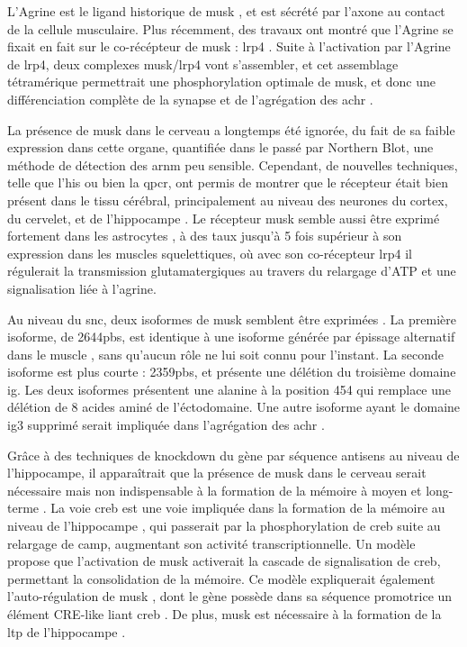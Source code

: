 	L'Agrine est le ligand historique de \gls{musk} \cite{Glass1996}, et est sécrété par l'axone au contact de la cellule musculaire. Plus récemment, des travaux ont montré que l'Agrine se fixait en fait sur le co-récépteur de \gls{musk} : \gls{lrp}4 \cite{Zhang2008,Kim2008}. Suite à l'activation par l'Agrine de \acrshort{lrp}4, deux complexes \gls{musk}/\gls{lrp}4 vont s'assembler, et cet assemblage tétramérique permettrait une phosphorylation optimale de \gls{musk}, et donc une différenciation complète de la synapse et de l'agrégation des \gls{achr} \cite{Zong2012}.
	
	La présence de \gls{musk} dans le cerveau a longtemps été ignorée, du fait de sa faible expression dans cette organe, quantifiée dans le passé par Northern Blot, une méthode de détection des \acrshort{arnm} peu sensible. Cependant, de nouvelles techniques, telle que l'\gls{his} ou bien la \gls{qpcr}, ont permis de montrer que le récepteur était bien présent dans le tissu cérébral, principalement au niveau des neurones du cortex, du cervelet, et de l'hippocampe \cite{Garcia-Osta2006, Ksiazek2007}. Le récepteur \gls{musk} semble aussi être exprimé fortement dans les astrocytes \cite{Sun2016}, à des taux jusqu'à 5 fois supérieur à son expression dans les muscles squelettiques, où avec son co-récepteur \gls{lrp}4 il régulerait la transmission glutamatergiques au travers du relargage d'ATP et une signalisation liée à l'agrine.
	
	Au niveau du \gls{snc}, deux isoformes de \gls{musk} semblent être exprimées \cite{Garcia-Osta2006}. La première isoforme, de 2644pbs, est identique à une isoforme générée par épissage alternatif dans le muscle \cite{Valenzuela1995}, sans qu'aucun rôle ne lui soit connu pour l'instant. La seconde isoforme est plus courte : 2359pbs, et présente une délétion du troisième domaine \gls{ig}. Les deux isoformes présentent une alanine à la position 454 qui remplace une délétion de 8 acides aminé de l'éctodomaine. Une autre isoforme ayant le domaine \gls{ig}3 supprimé serait impliquée dans l'agrégation des \gls{achr} \cite{Hesser1999}.
	
	Grâce à des techniques de knockdown du gène par séquence antisens au niveau de l'hippocampe, il apparaîtrait que la présence de \gls{musk} dans le cerveau serait nécessaire mais non indispensable à la formation de la mémoire à moyen et long-terme \cite{Garcia-Osta2006}. La voie \gls{creb} est une voie impliquée dans la formation de la mémoire au niveau de l'hippocampe \cite{Silva1998, Kandel2012,Kida2014,Ortega-Martinez2015}, qui passerait par la phosphorylation de \gls{creb} suite au relargage de \acrshort{camp}, augmentant son activité transcriptionnelle. Un modèle propose \cite{Garcia-Osta2006} que l'activation de \gls{musk} activerait la cascade de signalisation de \gls{creb}, permettant la consolidation de la mémoire. Ce modèle expliquerait également l'auto-régulation de \gls{musk} \cite{Moore2001}, dont le gène possède dans sa séquence promotrice un élément CRE-like liant \gls{creb} \cite{Kim2005}. De plus, \gls{musk} est nécessaire à la formation de la \gls{ltp} de l'hippocampe \cite{Garcia-Osta2006}.


